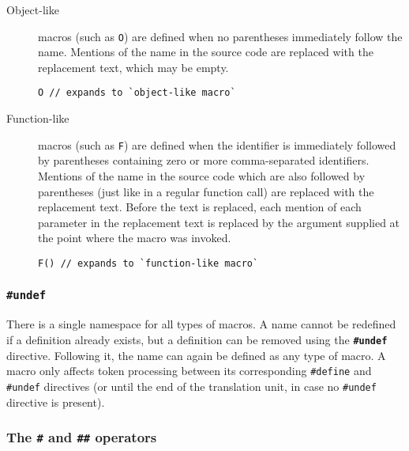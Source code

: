 \begin{description}
    \item[Object-like]
        macros (such as \texttt{O}) are defined when no parentheses immediately
        follow the name.  Mentions of the name in the source code are replaced
        with the replacement text, which may be empty.
        \begin{lstlisting}[style=c]
O // expands to `object-like macro`
        \end{lstlisting}
    \item[Function-like]
        macros (such as \texttt{F}) are defined when the identifier is
        immediately followed by parentheses containing zero or more
        comma-separated identifiers.  Mentions of the name in the source code
        which are also followed by parentheses (just like in a regular function
        call) are replaced with the replacement text.  Before the text is
        replaced, each mention of each parameter in the replacement text is
        replaced by the argument supplied at the point where the macro was
        invoked.
        \begin{lstlisting}[style=c]
F() // expands to `function-like macro`
        \end{lstlisting}
\end{description}

\subsubsection{\texttt{\#undef}}

There is a single namespace for all types of macros.  A name cannot be redefined
if a definition already exists\footnotemark, but a definition can be removed
using the \textbf{\texttt{\#undef}} directive.  Following it, the name can again
be defined as any type of macro.  A macro only affects token processing between
its corresponding \texttt{\#define} and \texttt{\#undef} directives (or until
the end of the translation unit, in case no \texttt{\#undef} directive is
present).


\subsubsection{The \texttt{\#} and \texttt{\#\#} operators}

